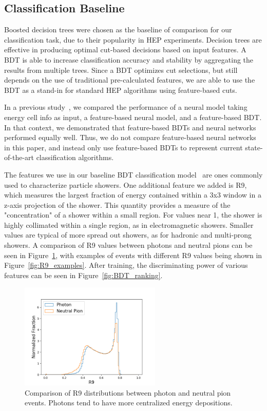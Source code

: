 \subsection*{Classification Baseline}\label{app:BDT}

Boosted decision trees were chosen as the baseline of comparison for our classification task, due to their popularity in HEP experiments. Decision trees are effective in producing optimal cut-based decisions based on input features. A BDT is able to increase classification accuracy and stability by aggregating the results from multiple trees. Since a BDT optimizes cut selections, but still depends on the use of traditional pre-calculated features, we are able to use the BDT as a stand-in for standard HEP algorithms using feature-based cuts.

In a previous study~\cite{NIPS}, we compared the performance of a neural model taking energy cell info as input, a feature-based neural model, and a feature-based BDT. In that context, we demonstrated that feature-based BDTs and neural networks performed equally well. Thus, we do not compare feature-based neural networks in this paper, and instead only use feature-based BDTs to represent current state-of-the-art classification algorithms.

The features we use in our baseline BDT classification model~\cite{NIPS} are ones commonly used to characterize particle showers. One additional feature we added is R9, which measures the largest fraction of energy contained within a 3x3 window in a z-axis projection of the shower. This quantity provides a measure of the "concentration" of a shower within a small region. For values near 1, the shower is highly collimated within a single region, as in electromagnetic showers. Smaller values are typical of more spread out showers, as for hadronic and multi-prong showers. A comparison of R9 values between photons and neutral pions can be seen in Figure~\ref{fig:R9}, with examples of events with different R9 values being shown in Figure~\ref{fig:R9_examples}. After training, the discriminating power of various features can be seen in Figure~\ref{fig:BDT_ranking}.

\begin{figure}[htbp]
\centering
\includegraphics[width=0.6\textwidth]{Images/Calo/R9_ratios.png}
\caption{Comparison of R9 distributions between photon and neutral pion events. Photons tend to have more centralized energy depositions.
\label{fig:R9}}
\end{figure}

